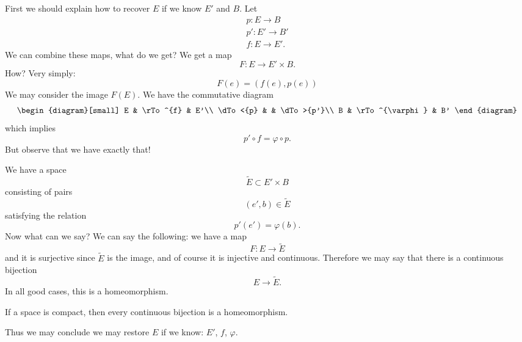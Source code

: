 First we should explain how to recover $E$ if we know $E'$ and
$B$. Let
\begin{subequations}
\begin{align}
p\colon E\to B\\
p'\colon E'\to B'\\
f\colon E\to E'.
\end{align}
\end{subequations}
We can combine these maps, what do we get? We get a map
\begin{equation}
F\colon E\to E'\times B.
\end{equation}
How? Very simply:
\begin{equation}
F(e)=\left(f(e),p(e)\right)
\end{equation}
We may consider the image $F(E)$. We have the commutative diagram
\begin{equation}
\begin{diagram}[small]
E & \rTo^{f} & E'\\
\dTo<{p} &  & \dTo>{p'}\\
B & \rTo^{\varphi} & B'
\end{diagram}
\end{equation}
which implies
\begin{equation}
p'\circ f=\varphi\circ p.
\end{equation}
But observe that we have exactly that!

We have a space
\begin{equation}
\widetilde{E}\subset E'\times B
\end{equation}
consisting of pairs
\begin{equation}
(e',b)\in \widetilde{E}
\end{equation}
satisfying the relation
\begin{equation}
p'(e')=\varphi(b).
\end{equation}
Now what can we say? We can say the following: we have a map
\begin{equation}
F\colon E\to\widetilde{E}
\end{equation}
and it is surjective since $\widetilde{E}$ is the image, and of
course it is injective and continuous. Therefore we may say that
there is a continuous bijection
\begin{equation}
E\to\widetilde{E}.
\end{equation}
In all good cases, this is a homeomorphism.
\begin{rmk}
If a space is compact, then every continuous bijection is a
homeomorphism. 
\end{rmk}
Thus we may conclude we may restore $E$ if we know: $E'$, $f$,
$\varphi$. 

